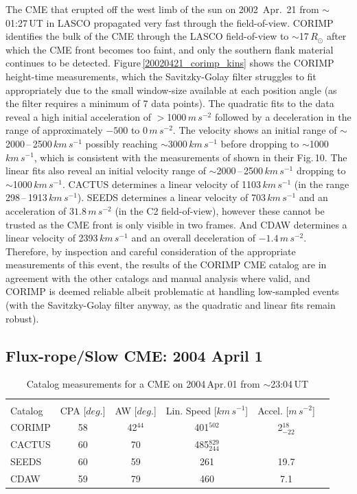 \documentclass[referee,a4paper,12pt,traditabstract]{swsc}
\begin{document}
\begin{linenumbers}
The CME that erupted off the west limb of the sun on 2002~Apr.~21 from $\sim$01:27\,UT in LASCO propagated very fast through the field-of-view. CORIMP identifies the bulk of the CME through the LASCO field-of-view to $\sim$17\,$R_\odot$ after which the CME front becomes too faint, and only the southern flank material continues to be detected. Figure\,\ref{20020421_corimp_kins} shows the CORIMP height-time measurements, which the Savitzky-Golay filter struggles to fit appropriately due to the small window-size available at each position angle (as the filter requires a minimum of 7 data points). The quadratic fits to the data reveal a high initial acceleration of $>$1000\,$m\,s^{-2}$ followed by a deceleration in the range of approximately $-500$ to $0\,m\,s^{-2}$. The velocity shows an initial range of $\sim$2000\,--\,2500\,$km\,s^{-1}$ possibly reaching $\sim$3000\,$km\,s^{-1}$ before dropping to $\sim$1000\,$km\,s^{-1}$, which is consistent with the measurements of \cite{2009A&A...495..325B} shown in their Fig.\,10. The linear fits also reveal an initial velocity range of $\sim$2000\,--\,2500\,$km\,s^{-1}$ dropping to $\sim$1000\,$km\,s^{-1}$. CACTUS determines a linear velocity of 1103$\,km\,s^{-1}$ (in the range 298\,--\,1913\,$km\,s^{-1}$). SEEDS determines a linear velocity of 703\,$km\,s^{-1}$ and an acceleration of $31.8\,m\,s^{-2}$ (in the C2 field-of-view), however these cannot be trusted as the CME front is only visible in two frames. And CDAW determines a linear velocity of 2393$\,km\,s^{-1}$ and an overall deceleration of $-1.4\,m\,s^{-2}$. Therefore, by inspection and careful consideration of the appropriate measurements of this event, the results of the CORIMP CME catalog are in agreement with the other catalogs and manual analysis where valid, and CORIMP is deemed reliable albeit problematic at handling low-sampled events (with the Savitzky-Golay filter anyway, as the quadratic and linear fits remain robust).


\subsection{Flux-rope/Slow CME: 2004 April 1}


\begin{table}[h]
\begin{tabular}{l*{4}{c}r}
\multicolumn{5}{c}{} \\

Catalog              & CPA [$deg.$] & AW [$deg.$] & Lin. Speed [$km\,s^{-1}$] & Accel. [$m\,s^{-2}$]  \\
\hline
CORIMP   & 58 & 42$^{44}$ & 401$^{502}$ & 2$_{-22}^{18}$ \\
CACTUS  & 60 & 70 & 485$_{244}^{829}$ & \\
SEEDS     & 60 & 59 & 261 & 19.7 \\
CDAW      & 59 & 79 & 460 & 7.1 \\
\end{tabular}
\caption{Catalog measurements for a CME on 2004\,Apr.\,01 from $\sim$23:04\,UT}
\label{table_20040401}
\end{table}


\end{linenumbers}
\end{document}
